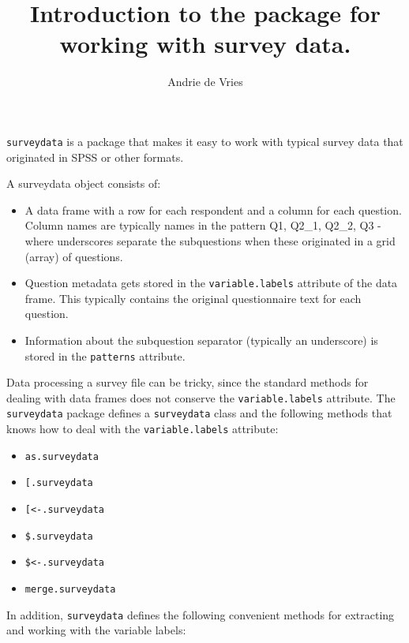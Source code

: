 \documentclass[a4paper]{article}
\title{Introduction to the \sdata{} package for working with survey data.}
\author{Andrie de Vries}
\newcommand{\sdata}{{\tt surveydata}}
\begin{document}


\maketitle

\sdata{} is a package that makes it easy to work with typical survey data that originated in SPSS or other formats.

A surveydata object consists of:

\begin{itemize}

  \item{A data frame with a row for each respondent and a column for each question.   Column names are typically names in the pattern Q1, Q2\_1, Q2\_2, Q3 - where underscores separate the subquestions when these originated in a grid (array) of questions.}

  \item{Question metadata gets stored in the \texttt{variable.labels} attribute of the data frame. This typically contains the original questionnaire text for each question.}
  
  \item{Information about the subquestion separator (typically an underscore) is stored in the \texttt{patterns} attribute.}
  
\end{itemize}


Data processing a survey file can be tricky, since the standard methods for dealing with data frames does not conserve the \texttt{variable.labels} attribute.  The \sdata{} package defines a \texttt{surveydata} class and the following methods that knows how to deal with the \texttt{variable.labels} attribute:

\begin{itemize}
  \item {\texttt{as.surveydata}}
  \item {\texttt{[.surveydata}}
  \item {\texttt{[<-.surveydata}}
  \item {\texttt{\$.surveydata}}
  \item {\texttt{\$<-.surveydata}}
  \item {\texttt{merge.surveydata}}
\end{itemize}

In addition, \sdata{} defines the following convenient methods for extracting and working with the variable labels:
\end{document}
